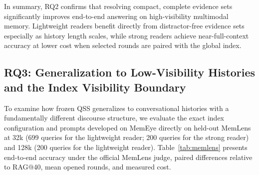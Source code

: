\documentclass[10pt]{article}
\newcommand{\qss}{QSS}
\begin{document}
In summary, RQ2 confirms that resolving compact, complete evidence sets significantly improves end-to-end answering on high-visibility multimodal memory. Lightweight readers benefit directly from distractor-free evidence sets especially as history length scales, while strong readers achieve near-full-context accuracy at lower cost when selected rounds are paired with the global index.

\subsection{RQ3: Generalization to Low-Visibility Histories and the Index Visibility Boundary}
\label{sec:rq3}

To examine how frozen \qss{} generalizes to conversational histories with a fundamentally different discourse structure, we evaluate the exact index configuration and prompts developed on MemEye directly on held-out MemLens at 32k (699 queries for the lightweight reader; 200 queries for the strong reader) and 128k (200 queries for the lightweight reader). Table~\ref{tab:memlens} presents end-to-end accuracy under the official MemLens judge, paired differences relative to RAG@40, mean opened rounds, and measured cost.
\end{document}
